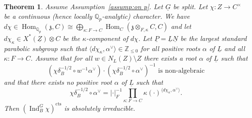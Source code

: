 \documentclass[a4paper]{amsart}
\numberwithin{equation}{section}
\newtheorem{thm}{Theorem}[section]
\theoremstyle{remark}
\theoremstyle{definition}
\DeclareMathOperator{\Ind}{Ind}
\DeclareMathOperator{\Hom}{Hom}
\newcommand{\Z}{\mathbb{Z}}
\newcommand{\Q}{\mathbb{Q}}
\newcommand{\alggrp}[1]{\underline{#1}}
\newcommand{\cts}{\mathrm{cts}}
\newcommand{\ang}[1]{\langle #1\rangle}
\renewcommand{\simeq}{\cong}
\begin{document}
\begin{thm}\label{thm:split-groups}
  Assume Assumption~\ref{assump:on p}.
  Let $\alggrp G$ be split.
  Let $\chi\colon Z \to C^{\times}$ be a continuous (hence locally $\Q_{p}$-analytic) character.
  We have $d\chi\in \Hom_{\Q_{p}}(\mathfrak{z},C)\simeq \bigoplus_{\kappa\colon F\to C}\Hom_{C}(\mathfrak{z} \otimes_{F,\kappa} C,C)$ and let $d\chi_{\kappa} \in X^*(\underline Z) \otimes C$  be the $\kappa$-component of $d\chi$.
  Let $\alggrp P = \alggrp L \alggrp N$ be the largest standard parabolic subgroup such that $\ang{d\chi_\kappa,\alpha^\vee} \in \Z_{\le 0}$ for all positive roots $\alpha$ of $\alggrp L$ and all $\kappa \colon F \to C$.
  Assume that for all $w \in N_L(Z) \setminus Z$ there exists a root $\alpha$ of $\alggrp L$ such that
  \begin{equation}\label{eq:split-condition1}
    \text{$(\chi \delta_B^{-1/2} \circ w^{-1}\alpha^\vee)\cdot (\chi \delta_B^{-1/2} \circ \alpha^\vee)^{-1}$ is non-algebraic}
  \end{equation}
  and that there exists no positive root $\alpha$ of $\alggrp L$ such that 
  \begin{equation}\label{eq:split-condition2}
    \chi \delta_B^{-1/2} \circ \alpha^\vee = \lvert \cdot\rvert_F^{-1}\prod_{\kappa\colon F\to C}\kappa(\cdot)^{\ang{d\chi_\kappa,\alpha^\vee}}.
  \end{equation}
  Then $(\Ind_{B}^{G}\chi)^{\cts}$ is absolutely irreducible.
\end{thm}
\end{document}
